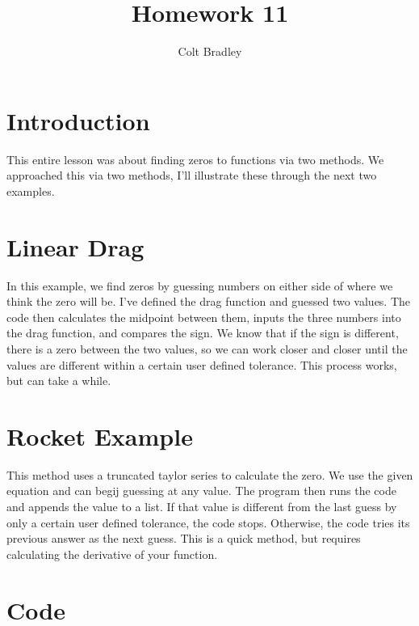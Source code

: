 \documentclass[11pt]{article}
\begin{document}
\title{Homework 11}
\author{Colt Bradley}
\date{}
\maketitle

\section{Introduction}
This entire lesson was about finding zeros to functions via two methods. We approached this via two methods, I'll illustrate these through the next two examples. 

\section{Linear Drag}

In this example, we find zeros by guessing numbers on either side of where we think the zero will be. I've defined the drag function and guessed two values. The code then calculates the midpoint between them, inputs the three numbers into the drag function, and compares the sign. We know that if the sign is different, there is a zero between the two values, so we can work closer and closer until the values are different within a certain user defined tolerance. This process works, but can take a while.

\section{Rocket Example}
This method uses a truncated taylor series to calculate the zero. We use the given equation and can begij guessing at any value. The program then runs the code and appends the value to a list. If that value is different from the last guess by only a certain user defined tolerance, the code stops. Otherwise, the code tries its previous answer as the next guess. This is a quick method, but requires calculating the derivative of your function. 

\section{Code}
\end{document}
